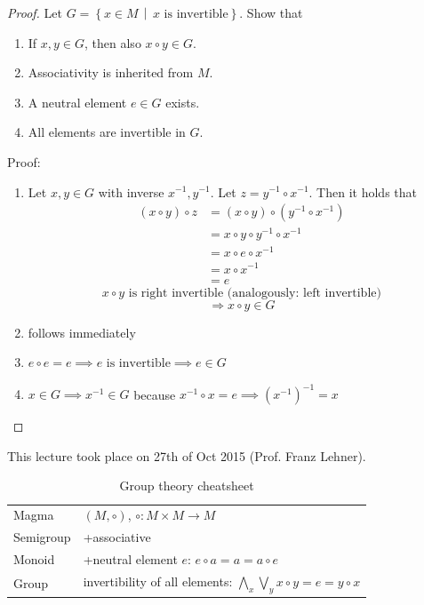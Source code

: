 \documentclass[a4paper,landscape,twocolumn]{article}
\newcommand\meta[3]{This #1 took place on #2 (#3).\par}
\newcommand\setdef[2]{\left\{#1\,\middle|\,#2\right\}}
\begin{document}
\begin{proof}
  Let $G = \setdef{x \in M}{x \text{ is invertible}}$.
  Show that
  \begin{enumerate}
    \item If $x, y \in G$, then also $x \circ y \in G$.
    \item Associativity is inherited from $M$.
    \item A neutral element $e \in G$ exists.
    \item All elements are invertible in $G$.
  \end{enumerate}

  Proof:
  \begin{enumerate}
    \item Let $x, y \in G$ with inverse $x^{-1}, y^{-1}$.
      Let $z = y^{-1} \circ x^{-1}$.
      Then it holds that
      \begin{align*}
        (x \circ y) \circ z &= (x \circ y) \circ (y^{-1} \circ x^{-1}) \\
          &= x \circ y \circ y^{-1} \circ x^{-1} \\
          &= x \circ e \circ x^{-1} \\
          &= x \circ x^{-1} \\
          &= e
      \end{align*}
      \[ x \circ y \text{ is right invertible (analogously: left invertible)} \]
      \[ \Rightarrow x \circ y \in G \]
    \item follows immediately
    \item $e \circ e = e \implies e \text{ is invertible} \implies e \in G$
    \item $x \in G \implies x^{-1} \in G$ because $x^{-1} \circ x = e \implies (x^{-1})^{-1} = x$
  \end{enumerate}
\end{proof}

\meta{lecture}{27th of Oct 2015}{Prof. Franz Lehner}

\begin{table}
  \begin{center}
    \begin{tabular}{ll}
     \hline
      Magma & $(M, \circ)$, $\circ: M \times M \rightarrow M$ \\
      Semigroup & +associative \\
      Monoid & +neutral element $e$: $e \circ a = a = a \circ e$ \\
      Group & invertibility of all elements: $\bigwedge_x \bigvee_y x\circ y = e = y \circ x$ \\
     \hline
    \end{tabular}
    \caption{Group theory cheatsheet}
  \end{center}
\end{table}
\end{document}
